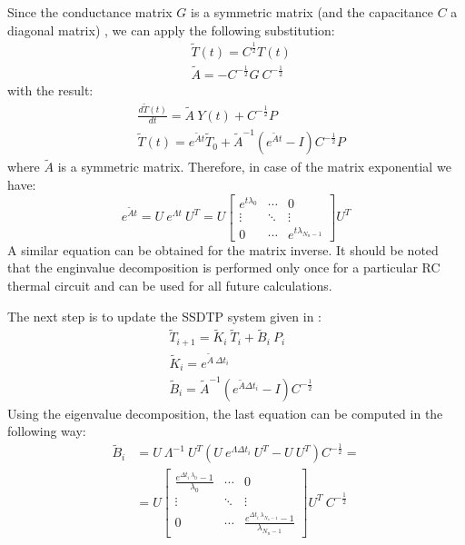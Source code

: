 Since the conductance matrix $G$ is a symmetric matrix (and the capacitance $C$ a diagonal matrix) \cite{rao2007}, we can apply the following substitution:
\begin{align*}
  & \tilde{T}(t) = C^{\frac{1}{2}} T(t) \\
  & \tilde{A} = -C^{-\frac{1}{2}} G \: C^{-\frac{1}{2}}
\end{align*}
with the result:
\begin{align*}
  & \frac{d\tilde{T}(t)}{dt} = \tilde{A} \: Y(t) + C^{-\frac{1}{2}} P \\
  & \tilde{T}(t) = e^{\tilde{A} t} \tilde{T}_0 + \tilde{A}^{-1} (e^{\tilde{A} t} - I) C^{-\frac{1}{2}} P
\end{align*}
where $\tilde{A}$ is a symmetric matrix. Therefore, in case of the matrix exponential we have:
\[
  e^{\tilde{A} t} = U \: e^{\Lambda t} \: U^T = U \left[
      \begin{array}{ccc}
        e^{t \lambda_0} & \cdots & 0 \\
        \vdots & \ddots & \vdots \\
        0 & \cdots & e^{t \lambda_{N_n - 1}}
      \end{array}
    \right] U^T
\]
A similar equation can be obtained for the matrix inverse. It should be noted that the enginvalue decomposition is performed only once for a particular RC thermal circuit and can be used for all future calculations.

The next step is to update the SSDTP system given in :
\begin{align}
  & \tilde{T}_{i+1} = \tilde{K}_i \: \tilde{T}_i + \tilde{B}_i \: P_i \label{eq:recurrent-equation} \\
  & \tilde{K}_i = e^{\tilde{A} \: \Delta t_i} \nonumber \\
  & \tilde{B}_i = \tilde{A}^{-1} \left( e^{\tilde{A} \Delta t_i} - I \right) C^{-\frac{1}{2}} \nonumber
\end{align}
Using the eigenvalue decomposition, the last equation can be computed in the following way:
\begin{align*}
  \tilde{B}_i & = U \: \Lambda^{-1} \: U^T \left(U \: e^{\Lambda \Delta t_i} \: U^T - U \: U^T \right) C^{-\frac{1}{2}} = \\
      & = U \left[
        \begin{array}{ccc}
          \frac{e^{\Delta t_i \: \lambda_0} - 1}{\lambda_0} & \cdots & 0 \\
          \vdots & \ddots & \vdots \\
          0 & \cdots & \frac{e^{\Delta t_i \: \lambda_{N_n - 1}} - 1}{\lambda_{N_n - 1}}
        \end{array}
      \right] U^T \: C^{-\frac{1}{2}}
\end{align*}

